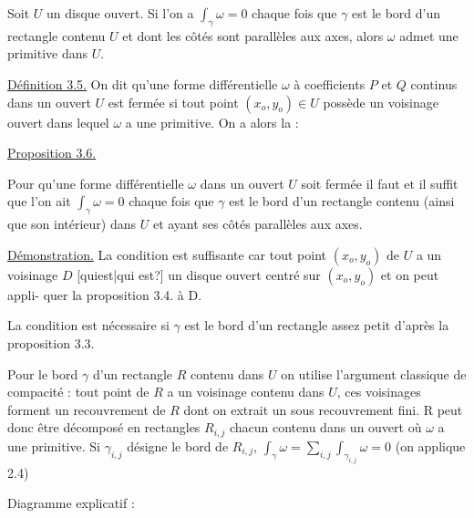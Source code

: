 \documentclass[11pt]{article}
\newcommand{\scanpage}[1]{\par\bigskip\noindent{\small\sffamily[scan #1]}\par}
\newcommand{\mspage}[1]{{\small\sffamily[p.\,#1]}}
\newcommand{\hand}[1]{\textcolor{blue}{#1}}
\newcommand{\uline}[1]{\underline{#1}}
\newcommand{\unsure}[1]{[#1?]}
\newenvironment{diagramblock}{\par\begin{center}}{\end{center}\par}
\begin{document}
Soit $U$ un disque ouvert. Si l'on a $\int_\gamma \omega = 0$ chaque fois que $\gamma$
est le bord d'un rectangle contenu $U$ et dont les côtés sont parallèles aux
axes, alors $\omega$ admet une primitive dans $U$.

\mspage{\hand{167}}

\clearpage
\scanpage{119/168}
\mspage{- 7 -}

\uline{Définition 3.5.}
On dit qu'une forme différentielle $\omega$ à coefficients $P$ et $Q$
continus dans un ouvert $U$ est fermée si tout point $(x_o,y_o) \in U$ possède
un voisinage ouvert dans lequel $\omega$ a une primitive. On a alors la :

\uline{Proposition 3.6.}

Pour qu'une forme différentielle $\omega$ dans un ouvert $U$ soit fermée
il faut et il suffit que l'on ait $\int_\gamma \omega = 0$ chaque fois que $\gamma$ est le bord
d'un rectangle contenu (ainsi que son intérieur) dans $U$ et ayant ses côtés
parallèles aux axes.

\uline{Démonstration.} La condition est suffisante car tout point $(x_o,y_o)$ de $U$ a
un voisinage $D$ \unsure{quiest|qui est} un disque ouvert centré sur $(x_o,y_o)$ et on peut appli-%
quer la proposition 3.4. à D.

La condition est nécessaire si $\gamma$ est le bord d'un rectangle assez petit
d'après la proposition 3.3.

Pour le bord $\gamma$ d'un rectangle $R$ contenu dans $U$ on utilise
l'argument classique de compacité : tout point de $R$ a un voisinage contenu
dans $U$, ces voisinages forment un recouvrement de $R$ dont on extrait un
sous recouvrement fini. R peut donc être décomposé en rectangles $R_{i,j}$ chacun
contenu dans un ouvert où $\omega$ a une primitive. Si $\gamma_{i,j}$ désigne le bord de
$R_{i,j}$, $\int_\gamma \omega = \sum_{i,j} \int_{\gamma_{i,j}} \omega = 0$
(on applique 2.4)

Diagramme explicatif :
\begin{diagramblock}\end{diagramblock}
\end{document}
